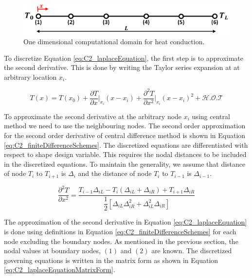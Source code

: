 \begin{figure}[h]
	\centering
	\includegraphics[width=14.00cm]{Chapter_2/figure/benchmark_case_computational_domain.png}
	\caption{One dimensional computational domain for heat conduction.}
	\label{fig:C2_discretizedDomain}
\end{figure}

To discretize Equation \eqref{eq:C2_laplaceEquation}, the first step is to approximate the second derivative. This is done by writing the Taylor series expansion at at arbitrary location $x_i$.

\begin{equation*}
	T(x) = 
	T(x_0) + 
	\frac{\partial T}{\partial x} \bigg|_{x_i} (x - x_i) + 
	\frac{\partial^2 T}{\partial x^2} \bigg|_{x_i} (x - x_i)^2 + 
	\mathcal{H} . \mathcal{O} . \mathcal{T}
\end{equation*}

To approximate the second derivative at the arbitrary node $x_i$ using central method we need to use the neighbouring nodes. The second order approximation for the second order derivative of central difference method is shown in Equation \eqref{eq:C2_finiteDifferenceSchemes}. The discretized equations are differentiated with respect to shape design variable. This requires the nodal distances to be included in the discretized equations. To maintain the generality, we assume that distance of node $T_i$ to $T_{i+1}$ is $\Delta_i$ and the distance of node $T_i$ to $T_{i-1}$ is $\Delta_{i-1}$.

\begin{equation}\label{eq:C2_finiteDifferenceSchemes}
	\frac{\partial^2 T}{\partial x^2} = 
	\frac{T_{i-1} \Delta_{iL} - 
	      T_{i} (\Delta_{iL} + \Delta_{iR}) + 
	      T_{i+1} \Delta_{iR}}
	     {\dfrac{1}{2} \left[ \Delta_{iL} \Delta_{iR}^2 + 
	                         \Delta_{iL}^2 \Delta_{iR} \right]}
\end{equation}

The approximation of the second derivative in Equation \eqref{eq:C2_laplaceEquation} is done using definitions in Equation \eqref{eq:C2_finiteDifferenceSchemes} for each node excluding the boundary nodes. As mentioned in the previous section, the nodal values at boundary nodes, $(1)$ and $(2)$ are known. The discretized governing equations is written in the matrix form as shown in Equation \eqref{eq:C2_laplaceEquationMatrixForm}.

